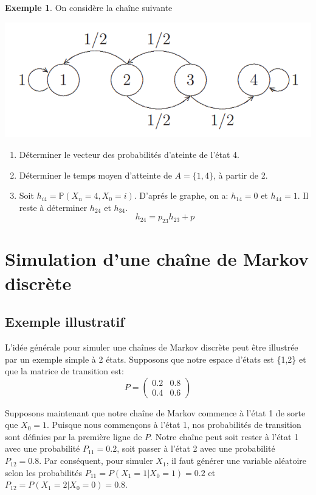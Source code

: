 \documentclass[
]{book}
\theoremstyle{definition}
\theoremstyle{definition}
\newtheorem{example}{Exemple}[chapter]
\theoremstyle{definition}
\theoremstyle{remark}
\begin{document}
\begin{example}
\protect\hypertarget{exm:unnamed-chunk-69}{}{\label{exm:unnamed-chunk-69} }On considère la chaîne suivante
\end{example}

\begin{center}\includegraphics[width=0.45\linewidth]{images/graphe3} \end{center}

\begin{enumerate}
\def\labelenumi{\arabic{enumi})}
\item
  Déterminer le vecteur des probabilités d'ateinte de l'état 4.
\item
  Déterminer le temps moyen d'atteinte de \(A=\{1,4\}\), à partir de 2.
\item
  Soit \(h_{i4}=\mathbb{P}(X_{n}=4,X_0=i)\). D'aprés le graphe, on a: \(h_{14}=0\) et \(h_{44}=1\). Il reste à déterminer \(h_{24}\) et \(h_{34}\).
  \[ h_{24}=p_{23}h_{23}+p_{}\]
\end{enumerate}

\hypertarget{simulation-dune-chauxeene-de-markov-discruxe8te}{%
\section{Simulation d'une chaîne de Markov discrète}\label{simulation-dune-chauxeene-de-markov-discruxe8te}}

\hypertarget{exemple-illustratif}{%
\subsection{Exemple illustratif}\label{exemple-illustratif}}

L'idée générale pour simuler une chaînes de Markov discrète peut être illustrée par un exemple simple à 2 états. Supposons que notre espace d'états est \{1,2\} et que la matrice de transition est:
\[ P=\left(
\begin{array}{cc}
0.2 & 0.8 \\
0.4 & 0.6
\end{array}
\right)\]

Supposons maintenant que notre chaîne de Markov commence à l'état 1 de sorte que \(X_0 = 1\). Puisque nous commençons à l'état 1, nos probabilités de transition sont définies par la première ligne de \(P\). Notre chaîne peut soit rester à l'état 1 avec une probabilité \(P_{11}=0.2\), soit passer à l'état 2 avec une probabilité \(P_{12}=0.8\). Par conséquent, pour simuler \(X_1\), il faut générer une variable aléatoire selon les probabilités \(P_{11} = P (X_1 = 1 | X_0 = 1) = 0.2\) et \(P_{12} = P (X_1 = 2 | X_0 = 0) = 0.8\).
\end{document}
